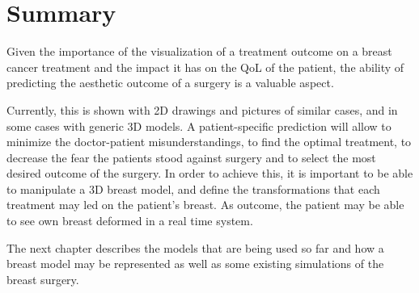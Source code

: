 \section{Summary}

Given the importance of the visualization of a treatment outcome on a breast cancer treatment and the impact it has on the QoL of the patient, the ability of predicting the aesthetic outcome of a surgery is a valuable aspect.

Currently, this is shown with 2D drawings and pictures of similar cases, and in some cases with generic 3D models. A patient-specific prediction will allow to minimize the doctor-patient misunderstandings, to find the optimal treatment, to decrease the fear the patients stood against surgery and to select the most desired outcome of the surgery. In order to achieve this, it is important to be able to manipulate a 3D breast model, and define the transformations that each treatment may led on the patient's breast. As outcome, the patient may be able to see own breast deformed in a real time system.

The next chapter describes the models that are being used so far and how a breast model may be represented as well as some existing simulations of the breast surgery.
